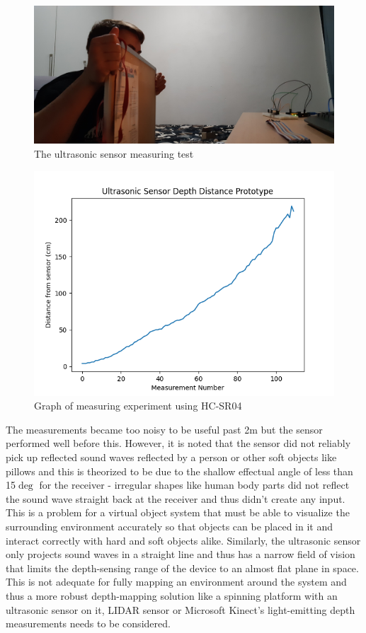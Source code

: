 \begin{figure}[h]
    \centering
    \includegraphics[width=0.5\linewidth]{figures/ultrasonic_prototype_setup1.jpg}
    \caption{The ultrasonic sensor measuring test}
    \label{fig:ultrasonic_measuring}
\end{figure}

\begin{figure}[h]
    \centering
    \includegraphics[width=0.4\linewidth]{figures/ultrasonic_prototype_graph.png}
    \caption{Graph of measuring experiment using HC-SR04}
    \label{fig:HCSR04_graph}
\end{figure}

The measurements became too noisy to be useful past 2m but the sensor performed well before this. However, it is noted that the sensor did not reliably pick up reflected sound waves reflected by a person or other soft objects like pillows and this is theorized to be due to the shallow effectual angle of less than 15$\deg$ for the receiver - irregular shapes like human body parts did not reflect the sound wave straight back at the receiver and thus didn't create any input. This is a problem for a virtual object system that must be able to visualize the surrounding environment accurately so that objects can be placed in it and interact correctly with hard and soft objects alike. Similarly, the ultrasonic sensor only projects sound waves in a straight line and thus has a narrow field of vision that limits the depth-sensing range of the device to an almost flat plane in space. This is not adequate for fully mapping an environment around the system and thus a more robust depth-mapping solution like a spinning platform with an ultrasonic sensor on it, LIDAR sensor or Microsoft Kinect's light-emitting depth measurements needs to be considered. \newline

